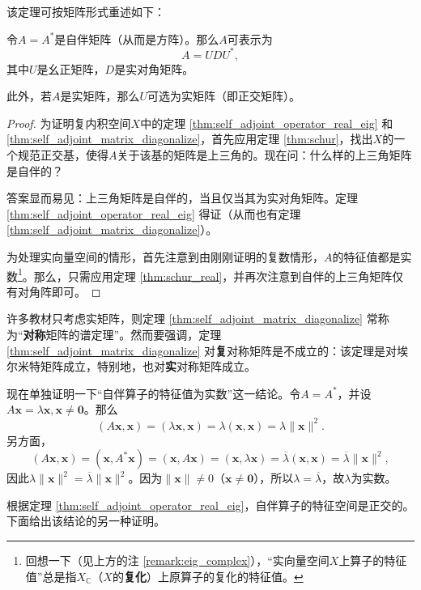 该定理可按矩阵形式重述如下：

\begin{theorem}\label{thm:self_adjoint_matrix_diagonalize}
    令$A=A^*$是自伴矩阵（从而是方阵）。那么$A$可表示为\[A=UDU^*,\]其中$U$是幺正矩阵，$D$是实对角矩阵。

    此外，若$A$是实矩阵，那么$U$可选为实矩阵（即正交矩阵）。
\end{theorem}

\begin{proof}
    为证明复内积空间$X$中的定理 \ref{thm:self_adjoint_operator_real_eig} 和 \ref{thm:self_adjoint_matrix_diagonalize}，首先应用定理 \ref{thm:schur}，找出$X$的一个规范正交基，使得$A$关于该基的矩阵是上三角的。现在问：什么样的上三角矩阵是自伴的？

    答案显而易见：上三角矩阵是自伴的，当且仅当其为实对角矩阵。定理 \ref{thm:self_adjoint_operator_real_eig} 得证（从而也有定理 \ref{thm:self_adjoint_matrix_diagonalize}）。

    为处理实向量空间的情形，首先注意到由刚刚证明的复数情形，$A$的特征值都是实数\footnote{回想一下（见上方的注 \ref{remark:eig_complex}），“实向量空间$X$上算子的特征值”总是指$X_\mathbb{C}$（$X$的{\bf 复化}）上原算子的复化的特征值。}。那么，只需应用定理 \ref{thm:schur_real}，并再次注意到自伴的上三角矩阵仅有对角阵即可。
\end{proof}

\begin{remark*}
    许多教材只考虑实矩阵，则定理 \ref{thm:self_adjoint_matrix_diagonalize} 常称为“{\bf 对称}矩阵的谱定理”。然而要强调，定理 \ref{thm:self_adjoint_matrix_diagonalize} 对{\bf 复}对称矩阵是不成立的：该定理是对埃尔米特矩阵成立，特别地，也对{\bf 实}对称矩阵成立。
\end{remark*}

现在单独证明一下“自伴算子的特征值为实数”这一结论。令$A=A^*$，并设$A\mathbf{x}=\lambda\mathbf{x},\mathbf{x}\neq\mathbf{0}$。那么\[(A\mathbf{x},\mathbf{x})=(\lambda\mathbf{x},\mathbf{x})=\lambda(\mathbf{x},\mathbf{x})=\lambda\|\mathbf{x}\|^2.\]
另方面，\[(A\mathbf{x},\mathbf{x})=(\mathbf{x},A^*\mathbf{x})=(\mathbf{x},A\mathbf{x})=(\mathbf{x},\lambda\mathbf{x})=\overline{\lambda}(\mathbf{x},\mathbf{x})=\overline{\lambda}\|\mathbf{x}\|^2,\]
因此$\lambda\|\mathbf{x}\|^2=\overline{\lambda}\|\mathbf{x}\|^2$。因为$\|\mathbf{x}\|\ne 0$（$\mathbf{x}\ne \mathbf{0}$），所以$\lambda=\overline{\lambda}$，故$\lambda$为实数。

根据定理 \ref{thm:self_adjoint_operator_real_eig}，自伴算子的特征空间是正交的。下面给出该结论的另一种证明。


